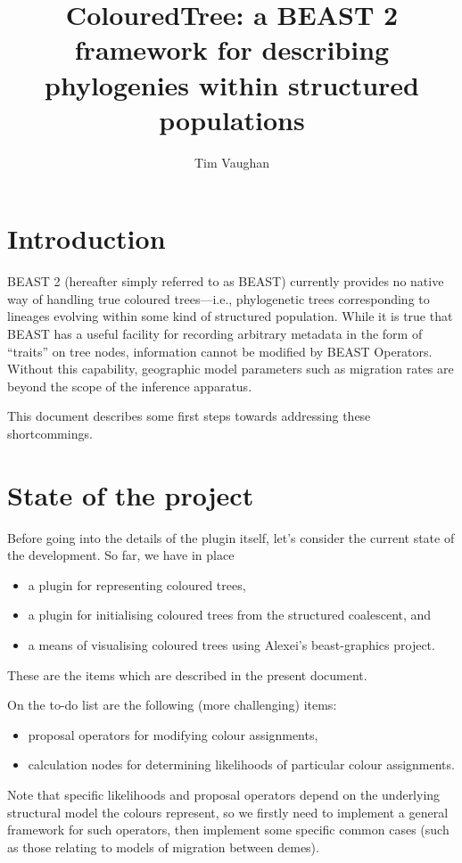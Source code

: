 \documentclass[a4paper,11pt]{paper}
\title{ColouredTree: a BEAST 2 framework for describing
phylogenies within structured populations}
\author{Tim Vaughan}
\newcommand{\project}[1]{\textsf{#1}}
\begin{document}
\maketitle

\section{Introduction}

BEAST 2 (hereafter simply referred to as BEAST) currently provides no
native way of handling true coloured trees---i.e., phylogenetic trees
corresponding to lineages evolving within some kind of structured
population. While it is true that BEAST has a useful facility for
recording arbitrary metadata in the form of ``traits'' on tree nodes,
information cannot be modified by BEAST Operators.  Without this
capability, geographic model parameters such as migration rates are
beyond the scope of the inference apparatus.

This document describes some first steps towards addressing these
shortcommings.

\section{State of the project}
Before going into the details of the plugin itself, let's consider the
current state of the development. So far, we have in place
\begin{itemize}
	\item a plugin for representing coloured trees,
	\item a plugin for initialising coloured trees from the structured
		coalescent, and
	\item a means of visualising coloured trees using Alexei's
		\project{beast-graphics} project.
\end{itemize}
These are the items which are described in the present document.

On the to-do list are the following (more challenging) items:
\begin{itemize}
	\item proposal operators for modifying colour assignments,
	\item calculation nodes for determining likelihoods of particular
		colour assignments.
\end{itemize}
Note that specific likelihoods and proposal operators depend on the
underlying structural model the colours represent, so we firstly need
to implement a general framework for such operators, then implement
some specific common cases (such as those relating to models of
migration between demes).
\end{document}
